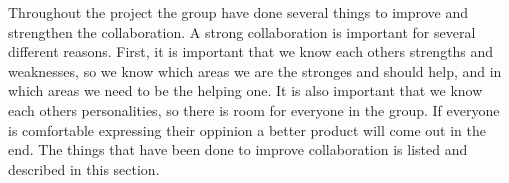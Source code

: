 
Throughout the project the group have done several things to improve and strengthen the collaboration. A strong collaboration is important for several different reasons. First, it is important that we know each others strengths and weaknesses, so we know which areas we are the stronges and should help, and in which areas we need to be the helping one. It is also important that we know each others personalities, so there is room for everyone in the group. If everyone is comfortable expressing their oppinion a better product will come out in the end. The things that have been done to improve collaboration is listed and described in this section. 